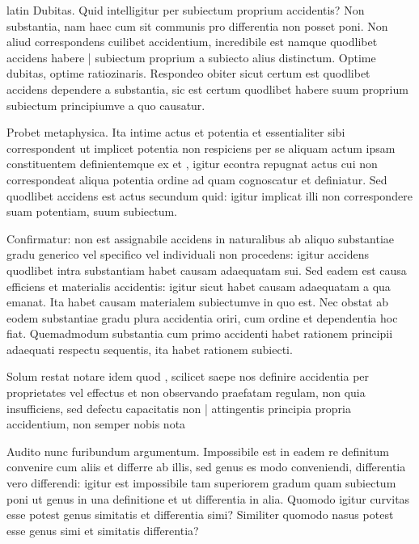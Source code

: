 \begin{otherlanguage*}{latin}
\pstart
  Dubitas. Quid intelligitur per subiectum proprium accidentis? Non substantia, nam haec cum sit communis pro differentia non posset poni. Non aliud correspondens cuilibet accidentium, incredibile est namque quodlibet accidens habere \textnormal{|}   subiectum proprium a subiecto alius distinctum. Optime dubitas, optime ratiozinaris. Respondeo obiter sicut certum est quodlibet accidens dependere a substantia, sic est certum quodlibet habere suum proprium subiectum principiumve a quo causatur. 
\pend

\pstart
  Probet metaphysica. Ita intime actus et potentia et essentialiter sibi correspondent ut implicet potentia non respiciens per se aliquam actum ipsam constituentem definientemque ex  et , igitur econtra repugnat actus cui non correspondeat aliqua potentia ordine ad quam cognoscatur et definiatur. Sed quodlibet accidens est actus secundum quid: igitur implicat illi non correspondere suam potentiam, suum subiectum. 
\pend

\pstart
  Confirmatur: non est assignabile accidens in naturalibus ab aliquo substantiae gradu generico vel specifico vel individuali non procedens: igitur accidens quodlibet intra substantiam habet causam adaequatam sui. Sed eadem est causa efficiens et materialis accidentis: igitur sicut habet causam adaequatam a qua emanat. Ita habet causam materialem subiectumve in quo est. Nec obstat ab eodem substantiae gradu plura accidentia oriri, cum ordine et dependentia hoc fiat. Quemadmodum substantia cum primo accidenti habet rationem principii adaequati respectu sequentis, ita habet rationem subiecti. 
\pend

\pstart
  Solum restat notare idem quod , scilicet saepe nos definire accidentia per proprietates vel effectus et non observando praefatam regulam, non quia insufficiens, sed defectu capacitatis non \textnormal{|} attingentis principia propria accidentium, non semper nobis nota 
\pend

\pstart
  Audito nunc furibundum argumentum. Impossibile est in eadem re definitum convenire cum aliis et differre ab illis, sed genus es modo conveniendi, differentia vero differendi: igitur est impossibile tam superiorem gradum quam subiectum poni ut genus in una definitione et ut differentia in alia. Quomodo igitur curvitas esse potest genus simitatis et differentia simi? Similiter quomodo nasus potest esse genus simi et simitatis differentia? 
\pend


\end{otherlanguage*}
